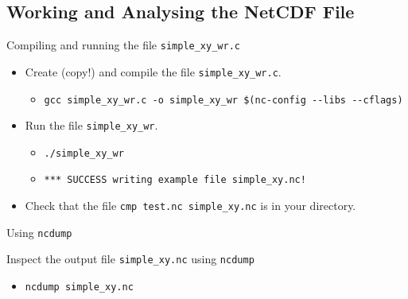 \documentclass[compress,11pt,xcolor=svgnames,aspectratio=169]{beamer}
\begin{document}
\subsection{Working and Analysing the NetCDF File}

\begin{frame}[fragile]{Compiling and running the file \texttt{simple\_xy\_wr.c}}

\begin{itemize}
\setlength\itemsep{0.6cm}

  \item Create (copy!) and compile the file \verb|simple_xy_wr.c|.

    \begin{itemize}
      \item {\tiny \verb|gcc simple_xy_wr.c -o simple_xy_wr $(nc-config --libs --cflags)|}
    \end{itemize}

  \item Run the file \verb|simple_xy_wr|.

      \begin{itemize}
        \item {\tiny  \verb|./simple_xy_wr|}
        \item {\tiny  \verb|*** SUCCESS writing example file simple_xy.nc!|}\\[0.5cm]
      \end{itemize}

  \item Check that the file \verb|cmp test.nc simple_xy.nc| is in your directory.

\end{itemize}

\end{frame}

\begin{frame}[fragile]{Using \texttt{ncdump}}

Inspect the output file \verb|simple_xy.nc| using \texttt{ncdump}

\begin{itemize}

  \item \verb|ncdump simple_xy.nc|

\end{itemize}

\end{frame}
\end{document}

